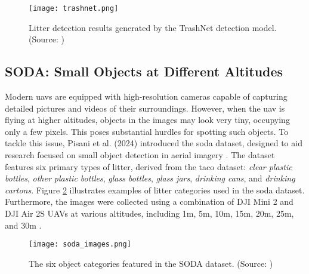 \begin{figure}[!htbp]
    \centering
    \texttt{[image: trashnet.png]}
    \caption{Litter detection results generated by the TrashNet detection model. (Source: \cite{trashnet})}
    \label{fig:trashnet}
\end{figure}

\subsection{SODA: Small Objects at Different Altitudes}
\label{subsec:3_sodadataset}

Modern \gls{uav}s are equipped with high-resolution cameras capable of capturing detailed pictures and videos of their surroundings. However, when the \gls{uav} is flying at higher altitudes, objects in the images may look very tiny, occupying only a few pixels. This poses substantial hurdles for spotting such objects. To tackle this issue, Pisani et al. (2024) introduced the \gls{soda} dataset, designed to aid research focused on small object detection in aerial imagery \cite{soda_dataset}. The dataset features six primary types of litter, derived from the \gls{taco} dataset: \textit{clear plastic bottles}, \textit{other plastic bottles}, \textit{glass bottles}, \textit{glass jars}, \textit{drinking cans}, and \textit{drinking cartons}. Figure \ref{fig:soda1} illustrates examples of litter categories used in the \gls{soda} dataset. Furthermore, the images were collected using a combination of DJI Mini 2 and DJI Air 2S UAVs at various altitudes, including 1m, 5m, 10m, 15m, 20m, 25m, and 30m \cite{soda_dataset, detect_litter}.

\begin{figure}[!htbp]
    \centering
    \texttt{[image: soda\_images.png]}
    \caption{The six object categories featured in the SODA dataset. (Source: \cite{soda_dataset})}
    \label{fig:soda1}
\end{figure}


